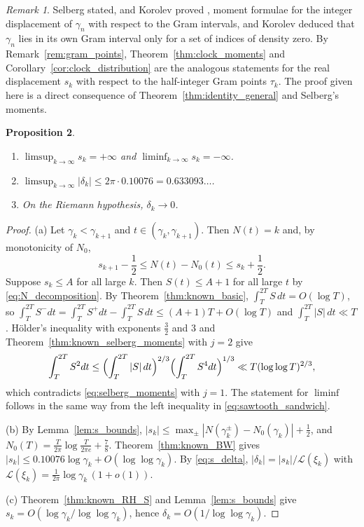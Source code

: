\documentclass[11pt,reqno]{amsart}
\theoremstyle{plain}\newtheorem{theorem}{Theorem}[section]\newtheorem{proposition}[theorem]{Proposition}\newtheorem{lemma}[theorem]{Lemma}\newtheorem{corollary}[theorem]{Corollary}
\theoremstyle{definition}\newtheorem{hypothesis}[theorem]{Hypothesis}\newtheorem{definition}[theorem]{Definition}
\theoremstyle{remark}\newtheorem{remark}[theorem]{Remark}\newtheorem{experiment}[theorem]{Experiment}\newtheorem{question}[theorem]{Question}\newtheorem{heuristic}[theorem]{Heuristic}\newtheorem{conjecture}[theorem]{Conjecture}
\newcommand{\NO}{N_0}\newcommand{\lL}{\mathcal L}\newcommand{\IT}{\mathcal I_T}\newcommand{\R}{\mathbb R}\newcommand{\N}{\mathbb N}\newcommand{\eps}{\varepsilon}\newcommand{\sgn}{\operatorname{sgn}}
\begin{document}
\begin{remark}\label{rem:korolev}
Selberg stated, and Korolev proved \cite{Korolev2012}, moment formulae for the integer displacement of $\gamma_n$ with respect to the Gram intervals, and Korolev deduced that $\gamma_n$ lies in its own Gram interval only for a set of indices of density zero. By Remark~\ref{rem:gram_points}, Theorem~\ref{thm:clock_moments} and Corollary~\ref{cor:clock_distribution} are the analogous statements for the real displacement $s_k$ with respect to the half-integer Gram points $\tau_k$. The proof given here is a direct consequence of Theorem~\ref{thm:identity_general} and Selberg's moments.
\end{remark}

\begin{proposition}\label{prop:extremes}
\begin{enumerate}[label=(\alph*),leftmargin=2em]
\item $\limsup_{k\to\infty}s_k=+\infty$ and $\liminf_{k\to\infty}s_k=-\infty$.
\item $\limsup_{k\to\infty}|\delta_k|\le2\pi\cdot0.10076=0.633093\ldots$.
\item On the Riemann hypothesis, $\delta_k\to0$.
\end{enumerate}
\end{proposition}

\begin{proof}
(a) Let $\gamma_k<\gamma_{k+1}$ and $t\in(\gamma_k,\gamma_{k+1})$. Then $N(t)=k$ and, by monotonicity of $\NO$,
\begin{equation}
s_{k+1}-\frac12\le N(t)-\NO(t)\le s_k+\frac12 .
\label{eq:sawtooth_sandwich}
\end{equation}
Suppose $s_k\le A$ for all large $k$. Then $S(t)\le A+1$ for all large $t$ by \eqref{eq:N_decomposition}. By Theorem~\ref{thm:known_basic}, $\int_T^{2T}S\,dt=O(\log T)$, so $\int_T^{2T}S^-dt=\int_T^{2T}S^+dt-\int_T^{2T}S\,dt\le(A+1)T+O(\log T)$ and $\int_T^{2T}|S|\,dt\ll T$. Hölder's inequality with exponents $\frac32$ and $3$ and Theorem~\ref{thm:known_selberg_moments} with $j=2$ give
\begin{equation}
\int_T^{2T}S^2dt\le\Bigl(\int_T^{2T}|S|\,dt\Bigr)^{2/3}\Bigl(\int_T^{2T}S^4dt\Bigr)^{1/3}\ll T(\log\log T)^{2/3},
\label{eq:holder_contradiction}
\end{equation}
which contradicts \eqref{eq:selberg_moments} with $j=1$. The statement for $\liminf$ follows in the same way from the left inequality in \eqref{eq:sawtooth_sandwich}.

(b) By Lemma~\ref{lem:s_bounds}, $|s_k|\le\max_\pm|N(\gamma_k^\pm)-\NO(\gamma_k)|+\frac12$, and $\NO(T)=\frac T{2\pi}\log\frac T{2\pi e}+\frac78$. Theorem~\ref{thm:known_BW} gives $|s_k|\le0.10076\log\gamma_k+O(\log\log\gamma_k)$. By \eqref{eq:s_delta}, $|\delta_k|=|s_k|/\lL(\xi_k)$ with $\lL(\xi_k)=\frac1{2\pi}\log\gamma_k\,(1+o(1))$.

(c) Theorem~\ref{thm:known_RH_S} and Lemma~\ref{lem:s_bounds} give $s_k=O(\log\gamma_k/\log\log\gamma_k)$, hence $\delta_k=O(1/\log\log\gamma_k)$.
\end{proof}
\end{document}
